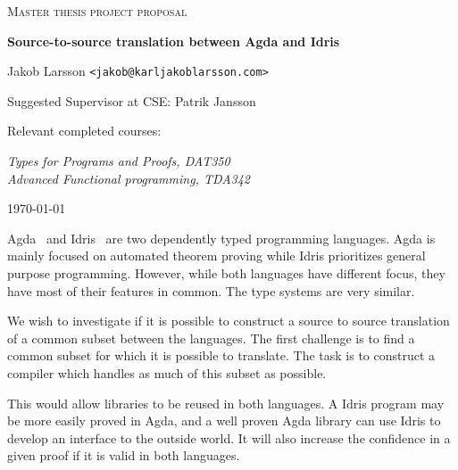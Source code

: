 \documentclass{scrartcl}
\begin{document}
\begin{titlepage}

\centering
{\scshape\LARGE Master thesis project proposal}

\vspace{0.5cm}
{\huge\bfseries Source-to-source translation between Agda and Idris
  }

\vspace{2cm}
{\Large Jakob Larsson \texttt{<jakob@karljakoblarsson.com>}}

\vspace{1.0cm}
{\large Suggested Supervisor at CSE: Patrik Jansson }

\vspace{1.5cm}
{\large Relevant completed courses:}

{\itshape
Types for Programs and Proofs, DAT350 \\
Advanced Functional programming, TDA342 \\
}

\vfill
{\large \today}

\end{titlepage}


Agda~\cite{agda} and Idris~\cite{idris} are two dependently typed programming
languages.  Agda is mainly focused on automated theorem proving while Idris
prioritizes general purpose programming.  However, while both languages have
different focus, they have most of their features in common. The type systems
are very similar.

We wish to investigate if it is possible to construct a source to source
translation of a common subset between the languages. The first challenge is to
find a common subset for which it is possible to translate. The task is to
construct a compiler which handles as much of this subset as possible.



This would allow libraries to be reused in both languages. A Idris program may
be more easily proved in Agda, and a well proven Agda library can use Idris to
develop an interface to the outside world.  It will also increase the confidence
in a given proof if it is valid in both languages.
\end{document}
